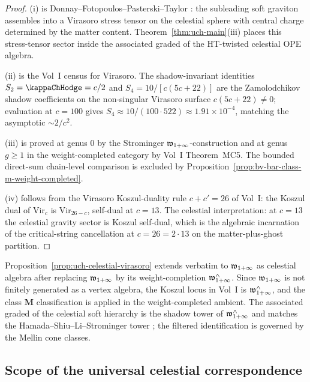 \begin{proof}
(i) is Donnay--Fotopoulos--Pasterski--Taylor
\cite{DonnayFotopoulosPasterskiTaylor21}: the subleading soft graviton
assembles into a Virasoro stress tensor on the celestial sphere with
central charge determined by the matter content. Theorem~\ref{thm:uch-main}(iii)
places this stress-tensor sector inside the associated graded of the
HT-twisted celestial OPE algebra.

(ii) is the Vol~I census for Virasoro. The shadow-invariant
identities $S_2 = \kap = c/2$ and $S_4 = 10/[c(5c + 22)]$ are
the Zamolodchikov shadow coefficients on the non-singular Virasoro
surface $c(5c+22)\ne0$; evaluation at $c = 100$ gives
$S_4 \approx 10/(100 \cdot 522) \approx 1.91 \times 10^{-4}$,
matching the asymptotic $\sim 2/c^2$.

(iii) is proved at genus $0$ by the Strominger $\mathfrak w_{1+\infty}$-construction
\cite{StromingerWInfinityCelestial} and at genus $g \geq 1$ in the
weight-completed category by Vol~I Theorem~MC5. The bounded
direct-sum chain-level comparison is excluded by
Proposition~\ref{prop:bv-bar-class-m-weight-completed}.

(iv) follows from the Virasoro Koszul-duality rule
$c + c' = 26$ of Vol~I: the Koszul dual of
$\mathrm{Vir}_c$ is $\mathrm{Vir}_{26-c}$, self-dual at $c = 13$.
The celestial interpretation: at $c = 13$ the celestial gravity
sector is Koszul self-dual, which is the algebraic incarnation of
the critical-string cancellation at $c = 26 = 2 \cdot 13$ on the
matter-plus-ghost partition.
\end{proof}

\begin{remark}
\label{rem:uch-winfty-celestial}
Proposition~\ref{prop:uch-celestial-virasoro} extends verbatim to
$\mathfrak w_{1+\infty}$ as celestial algebra after replacing $\mathfrak w_{1+\infty}$ by its
weight-completion $\mathfrak w_{1+\infty}^{\wedge}$. Since $\mathfrak w_{1+\infty}$ is not finitely
generated as a vertex algebra, the Koszul locus in Vol~I is
$\mathfrak w_{1+\infty}^{\wedge}$, and the class $\mathbf M$ classification is applied
in the weight-completed ambient. The associated graded of the
celestial soft hierarchy is the shadow tower of $\mathfrak w_{1+\infty}^{\wedge}$ and
matches the Hamada--Shiu--Li--Strominger tower
\cite{HamadaShiuSubsubSoft, LiStromingerHigherSoft}; the filtered
identification is governed by the Mellin cone classes.
\end{remark}

\subsection*{Scope of the universal celestial correspondence}

